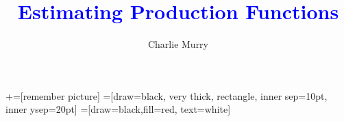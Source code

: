 \documentclass[11pt, aspectratio=169]{beamer}
\title[]{\textcolor{blue}{Estimating Production Functions}}
\author[CM]{Charlie Murry}
\begin{document}
\newcommand\marktopleft[1]{%
    \tikz[overlay,remember picture] 
        \node (marker-#1-a) at (-.3em,.3em) {};%
}
\newcommand\markbottomright[2]{%
    \tikz[overlay,remember picture] 
        \node (marker-#1-b) at (0em,0em) {};%
}
+=[remember picture] 
 =[draw=black, very thick, rectangle, inner sep=10pt, inner ysep=20pt]
 =[draw=black,fill=red, text=white]

\begin{frame}
\maketitle
\end{frame}

\end{document}
